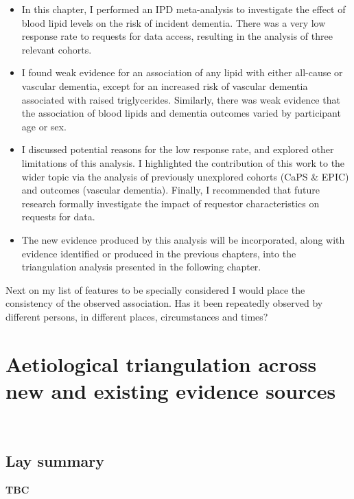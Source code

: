 \documentclass[a4paper, twoside]{templates/ociamthesis}
\begin{document}
\begin{itemize}
\item
  In this chapter, I performed an IPD meta-analysis to investigate the effect of blood lipid levels on the risk of incident dementia. There was a very low response rate to requests for data access, resulting in the analysis of three relevant cohorts.
\item
  I found weak evidence for an association of any lipid with either all-cause or vascular dementia, except for an increased risk of vascular dementia associated with raised triglycerides. Similarly, there was weak evidence that the association of blood lipids and dementia outcomes varied by participant age or sex.
\item
  I discussed potential reasons for the low response rate, and explored other limitations of this analysis. I highlighted the contribution of this work to the wider topic via the analysis of previously unexplored cohorts (CaPS \& EPIC) and outcomes (vascular dementia). Finally, I recommended that future research formally investigate the impact of requestor characteristics on requests for data.
\item
  The new evidence produced by this analysis will be incorporated, along with evidence identified or produced in the previous chapters, into the triangulation analysis presented in the following chapter.
\end{itemize}

\begin{savequote}
Next on my list of features to be specially considered I would place the
consistency of the observed association. Has it been repeatedly observed
by different persons, in different places, circumstances and times?
\end{savequote}



\hypertarget{tri-heading}{%
\chapter{Aetiological triangulation across new and existing evidence sources}\label{tri-heading}}

~

\minitoc 

\newpage

\begin{laybox}

\hypertarget{lay-summary-6}{%
\section*{Lay summary}\label{lay-summary-6}}

\textbf{TBC}

\end{laybox}
\end{document}
